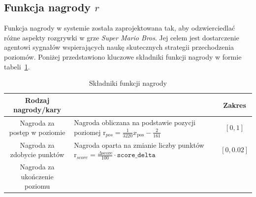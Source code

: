 \subsection{Funkcja nagrody \(r\)}

Funkcja nagrody w systemie została zaprojektowana tak, aby odzwierciedlać różne aspekty rozgrywki w grze \textit{Super Mario Bros}. Jej celem jest dostarczenie agentowi sygnałów wspierających naukę skutecznych strategii przechodzenia poziomów. Poniżej przedstawiono kluczowe składniki funkcji nagrody w formie tabeli~\ref{tab:reward_function}.
\begin{table}[!ht]
	\centering
	\caption{Składniki funkcji nagrody}
	\label{tab:reward_function}
	\begin{tabular}{|c|p{7.8cm}|c|}
		\hline
		\textbf{Rodzaj nagrody/kary}                                                        & \makecell{\textbf{Opis}} & \textbf{Zakres} \\ \hline
		\makecell{Nagroda za                                                                                                             \\ postęp w poziomie} &
		\makecell{Nagroda obliczana na                                                                                                   \\ podstawie pozycji poziomej                                                              \\
		\(\text{r}_{pos} = \frac{1}{3220} x_{\text{pos}} - \frac{2}{161}\)}                 &
		\([0,1]\)                                                                                                                        \\ \hline
		\makecell{Nagroda za                                                                                                             \\  zdobycie punktów} &
		\makecell{Nagroda oparta na                                                                                                      \\ zmianie liczby punktów                                                                    \\
		\(\text{r}_{score} = \frac{\Delta \text{score}}{100} \cdot \texttt{score\_delta}\)} &
		\([0, 0.02]\)                                                                                                                    \\ \hline
		\makecell{Nagroda za                                                                                                             \\ ukończenie poziomu} &

\end{tabular}
\end{table}
